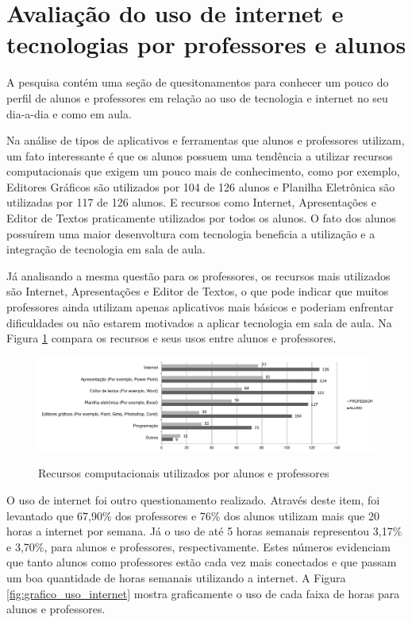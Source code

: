 \section{Avaliação do uso de internet e tecnologias por professores e alunos}

A pesquisa contém uma seção de quesitonamentos para conhecer um pouco do perfil de alunos e professores em relação ao uso de tecnologia e internet no seu dia-a-dia e como em aula. 

Na análise de tipos de aplicativos e ferramentas que alunos e professores utilizam, um fato interessante é que os alunos possuem uma tendência a utilizar recursos computacionais que exigem um pouco mais de conhecimento, como por exemplo, Editores Gráficos são utilizados por 104 de 126 alunos e Planilha Eletrônica são utilizadas por 117 de 126 alunos. E recursos como Internet, Apresentações e Editor de Textos praticamente utilizados por todos os alunos. O fato dos alunos possuírem uma maior desenvoltura com tecnologia beneficia a utilização e a integração de tecnologia em sala de aula.

Já analisando a mesma questão para os professores, os recursos mais utilizados são Internet, Apresentações e Editor de Textos, o que pode indicar que muitos professores ainda utilizam apenas aplicativos mais básicos e poderiam enfrentar dificuldades ou não estarem motivados a aplicar tecnologia em sala de aula. Na Figura \ref{fig:grafico_recursos} compara os recursos e seus usos entre alunos e professores.

\begin{figure}[!h]
\centering
\caption{Recursos computacionais utilizados por alunos e professores}
\includegraphics[width=1.0\textwidth]{pdfs/alunos-professores/recursos-computacionais.pdf} 
\label{fig:grafico_recursos} 
\end{figure}

O uso de internet foi outro questionamento realizado. Através deste item, foi levantado que 67,90\% dos professores e 76\% dos alunos utilizam mais que 20 horas a internet por semana. Já o uso de até 5 horas semanais representou 3,17\% e 3,70\%, para alunos e professores, respectivamente. Estes números evidenciam que tanto alunos como professores estão cada vez mais conectados e que passam um boa quantidade de horas semanais utilizando a internet. A Figura \ref{fig:grafico_uso_internet} mostra graficamente o uso de cada faixa de horas para alunos e professores.

